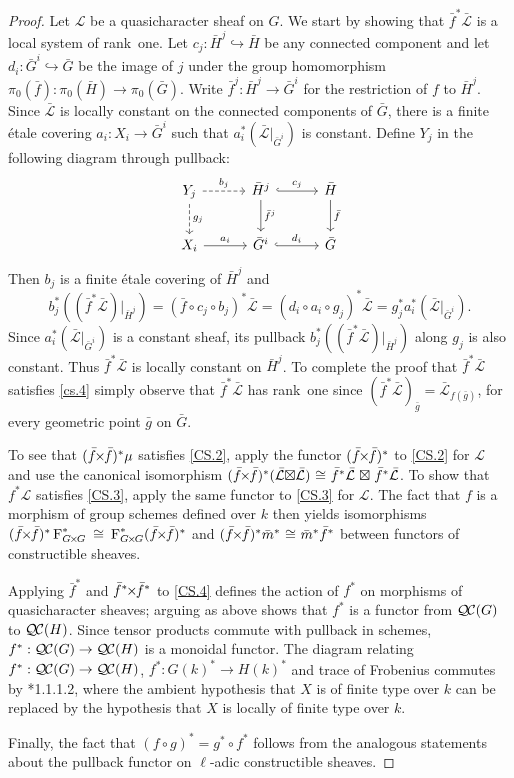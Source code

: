 \documentclass[11pt]{amsart}
\theoremstyle{plain}
\theoremstyle{definition}
\theoremstyle{remark}
\newcommand{\Fq}{k}
\newcommand{\Frob}[1]{\operatorname{F}_{#1}}
\newcommand{\iso}{{\ \cong\ }}
\newcommand{\qcs}[1]{{\mathcal{#1}}}
\newcommand{\gqcs}[1]{{\mathcal{\bar #1}}}
\newcommand{\QC}{{\mathcal{Q\hskip-0.8pt C}}}
\renewcommand{\bf}{\bar{f}}
\newcommand{\bg}{\bar{g}}
\newcommand{\bm}{\bar{m}}
\newcommand{\bG}{\bar{G}}
\newcommand{\bH}{\bar{H}}
\newcommand{\tight}[3]{\hspace{-#1pt}{#2}\hspace{-#3pt}}
\newcommand{\bfxf}{\text{$\bar{f} \tight{1}{\times}{1} \bar{f}$}}
\newcommand{\GxxG}{\text{$G \tight{1}{\times}{1} G$}}
\newcommand{\LxL}{\text{$\gqcs{L} \tight{0}{\boxtimes}{0} \gqcs{L}$}}
\begin{document}
\begin{proof}
  Let $\qcs{L}$ be a quasicharacter sheaf on $G$. We start by showing that
  $\bf^*\gqcs{L}$ is a local system of rank~one. Let $c_j :\bH^j \hookrightarrow \bH$ be any
  connected component and let $d_i : \bG^i \hookrightarrow \bG$ be the image of $j$ under the group
  homomorphism $\pi_0(\bf) : \pi_0(\bH) \to \pi_0(\bG)$.  Write $\bf^j : \bH^j \to \bG^i$
  for the restriction of $f$ to $\bH^j$.  Since $\gqcs{L}$ is locally constant on the connected
  components of $\bG$, there is a finite \'etale covering
  $a_i : X_i \to \bG^i$ such that $a_i^* (\gqcs{L}\vert_{\bG^i})$
  is constant.  Define $Y_j$ in the following diagram through pullback:
  \[
  \begin{tikzcd}[row sep=20, column sep=30]
   Y_j \dar[dashed]{g_j} \rar[dashed]{b_j} & \bH^j \dar{\bf^j} \rar[hook]{c_j} & \bH \dar{\bf} \\
   X_i \rar{a_i} & \bG^i \rar[hook]{d_i} & \bG
  \end{tikzcd}
  \]
  Then $b_j$ is a finite \'etale covering
  of $\bH^j$ and
  \[
  b_j^* \left( (\bf^* \gqcs{L})\vert_{\bH^j}\right)
  = (\bf\circ c_j \circ b_j)^*\gqcs{L}
  = (d_i\circ a_i\circ g_j)^*\gqcs{L} = g_j^* a_i^* (\gqcs{L}\vert_{\bG^i}).
  \]
%
  Since $a_i^* (\gqcs{L}\vert_{\bG^i})$ is a constant sheaf, its pullback
  $b_j^* \left( (\bf^*\gqcs{L})\vert_{\bH^j}\right)$ along $g_j$ is also constant.
  Thus $\bf^*\gqcs{L}$ is locally constant on
  $\bH^j$. To complete the proof that $\bf^*\gqcs{L}$ satisfies 
  \ref{cs.4}
  simply observe that $\bf^*\gqcs{L}$ has rank~one since 
  $(\bf^*\gqcs{L})_{\bg} = \gqcs{L}_{f(\bg)}$, for every geometric point ${\bg}$ on $\bG$.
  

  To see that $(\bfxf)^* \mu$ satisfies \ref{CS.2}, 
  apply the functor $(\bfxf)^*$
  to \ref{CS.2} for $\qcs{L}$ and use the canonical isomorphism
  $(\bfxf)^*(\LxL) \iso \bf^*\gqcs{L} \tight{-3}{\boxtimes}{-3} \bf^*\gqcs{L}$.
  To show that $f^*\qcs{L}$ satisfies 
  \ref{CS.3}, apply the same functor to \ref{CS.3} for $\qcs{L}$.
  The fact that $f$ is a morphism of group schemes defined over $\Fq$ then
  yields isomorphisms $(\bfxf)^*\Frob{\GxxG}^* \iso \Frob{\GxxG}^* (\bfxf)^*$
  and $(\bfxf)^* \bm^*\iso \bm^* \bf^*$ between functors of constructible sheaves.
  
  Applying $\bf^*$ and $\bf^* \tight{1}{\times}{1}\bf^*$ to \ref{CS.4} defines the action
  of $f^*$ on morphisms of quasicharacter sheaves; arguing as above shows that $f^*$ is
  a functor from $\QC(G)$ to $\QC(H)$.  Since tensor products commute with pullback in schemes,
  $f^* : \QC(G) \to \QC(H)$ is a monoidal functor.
%
  The diagram relating $f^* : \QC(G) \to \QC(H)$, $f^* : G(k)^* \to H(k)^*$ and trace of Frobenius
  commutes by \cite{laumon:87a}*{1.1.1.2}, where the ambient
  hypothesis that $X$ is of finite type over $\Fq$ can be replaced by
  the hypothesis that $X$ is locally of finite type over $\Fq$.
  
  Finally, the fact that $(f\circ g)^* = g^* \circ f^*$ follows from the analogous
  statements about the pullback functor on $\ell$-adic constructible sheaves.
\end{proof}
\end{document}
